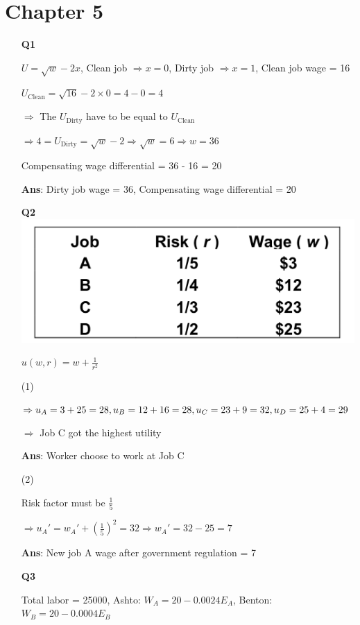 \documentclass[12pt]{article}
\begin{document}
\section{Chapter 5}
\begin{enumerate}
    \item [\textbf{Q1}]
    
    $U = \sqrt{w} - 2x$, \@ Clean job $\Rightarrow x = 0$, \@ Dirty job $\Rightarrow x = 1$, \@ Clean job wage = 16

    $U_\text{Clean} = \sqrt{16} - 2 \times 0 = 4 - 0 = 4$

    $\Rightarrow$ The $U_\text{Dirty}$ have to be equal to $U_\text{Clean}$

    $\Rightarrow 4 = U_\text{Dirty} = \sqrt{w} - 2 \Rightarrow \sqrt{w} = 6 \Rightarrow w = 36$

    Compensating wage differential = 36 - 16 = 20

    \textbf{Ans}: Dirty job wage = 36, Compensating wage differential = 20



    \item [\textbf{Q2}]
    \includegraphics[width=0.5\linewidth]{hw3_img4.jpeg}

    $u(w, r) = w + \frac{1}{r^2}$

    (1)

    $\Rightarrow u_A = 3 + 25 = 28, u_B = 12 + 16 = 28,\\ u_C = 23 + 9 = 32, u_D = 25 + 4 = 29$

    $\Rightarrow$ Job C got the highest utility

    \textbf{Ans}: Worker choose to work at Job C

    (2)

    Risk factor must be $\frac{1}{5}$ 
    
    $\Rightarrow u_A\prime = w_A\prime + (\frac{1}{5})^2 = 32 \Rightarrow w_A\prime = 32 - 25 = 7$

    \textbf{Ans}: New job A wage after government regulation = 7

    \item [\textbf{Q3}]
    
    Total labor = 25000, Ashto: $W_A = 20 - 0.0024E_A$, Benton: $W_B = 20 - 0.0004E_B$


\end{enumerate}
\end{document}
